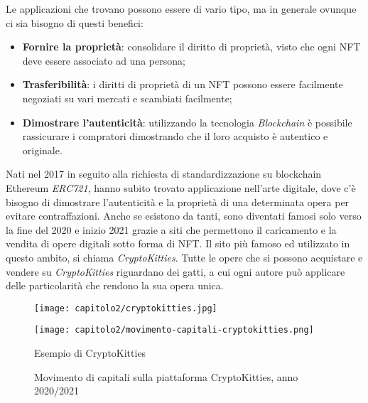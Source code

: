 Le applicazioni che trovano possono essere di vario tipo, ma in generale ovunque ci sia bisogno di questi benefici:
\begin{itemize}
  \item \textbf{Fornire la proprietà}: consolidare il diritto di proprietà, visto che ogni NFT deve essere associato ad una persona;
  \item \textbf{Trasferibilità}: i diritti di proprietà di un NFT possono essere facilmente negoziati su vari mercati e scambiati facilmente;
  \item \textbf{Dimostrare l'autenticità}: utilizzando la tecnologia \emph{Blockchain} è possibile rassicurare i compratori dimostrando che il loro acquisto è autentico e originale.
\end{itemize}

Nati nel 2017 in seguito alla richiesta di standardizzazione su blockchain Ethereum \emph{ERC721}, hanno subito trovato applicazione nell'arte digitale, dove c'è bisogno di dimostrare l'autenticità e la proprietà di una determinata opera per evitare contraffazioni.
Anche se esistono da tanti, sono diventati famosi solo verso la fine del 2020 e inizio 2021 grazie a siti che permettono il caricamento e la vendita di opere digitali sotto forma di NFT. Il sito più famoso ed utilizzato in questo ambito, si chiama \emph{CryptoKitties}. Tutte le opere che si possono acquistare e vendere su \emph{CryptoKitties} riguardano dei gatti, a cui ogni autore può applicare delle particolarità che rendono la sua opera unica.

\begin{figure}[!tbph]
  
  \centering

  \begin{minipage}{0.5\textwidth}
    \texttt{[image: capitolo2/cryptokitties.jpg]}
  \end{minipage}%
  \begin{minipage}{0.5\textwidth}
    \texttt{[image: capitolo2/movimento-capitali-cryptokitties.png]}
  \end{minipage}

  \begin{minipage}[t]{0.5\textwidth}
    \caption{Esempio di CryptoKitties}
  \end{minipage}%
  \begin{minipage}[t]{0.5\textwidth}
    \caption{Movimento di capitali sulla piattaforma CryptoKitties, anno 2020/2021}
  \end{minipage}
\end{figure}

